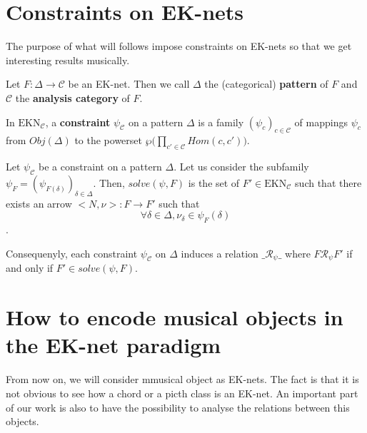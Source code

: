 

\section{Constraints on EK-nets}



The purpose of what will follows impose constraints on EK-nets so that we get interesting results musically.

Let $F : \Delta \rightarrow \mathcal{C}$ be an EK-net. Then we call $\Delta$ the (categorical) \textbf{pattern} of $F$ and $\mathcal{C}$ the \textbf{analysis category} of $F$.

\begin{defn}[Constraint]
    In $\text{EKN}_\mathcal{C}$, a \textbf{constraint} $\psi_\mathcal{C}$ on a pattern $\Delta$ is a family $(\psi_c)_{c\in\mathcal{C}}$ of mappings $\psi_c$ from $Obj(\Delta)$ to the powerset $\wp\big(\prod_{c'\in\mathcal{C}}Hom(c,c')\big)$.
\end{defn}


\begin{defn}
    Let $\psi_\mathcal{C}$ be a constraint on a pattern $\Delta$.
    Let us consider the subfamily $\psi_F = (\psi_{F(\delta)})_{\delta\in\Delta}$. Then, $solve(\psi,F)$ is the set of $F' \in \text{EKN}_\mathcal{C}$ such that there exists an arrow $\big< N, \nu\big> : F \rightarrow F'$ such that
    $$\forall \delta \in \Delta, \nu_\delta \in \psi_F(\delta)$$.
\end{defn}

Consequenyly, each constraint $\psi_\mathcal{C}$ on $\Delta$ induces a relation
$\_\mathcal{R}_\psi \_$ where $F\mathcal{R}_\psi F'$ if and only if $F'\in solve(\psi,F)$.









\section{How to encode musical objects in the EK-net paradigm}

From now on, we will consider mmusical object as EK-nets. The fact is that it is not obvious to see how a chord or a picth class is an EK-net. An important part of our work is also to have the possibility to analyse the relations between this objects.

